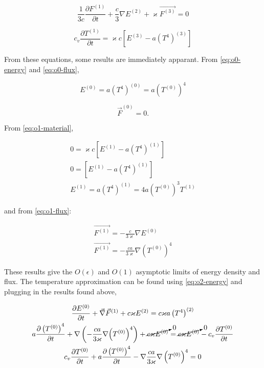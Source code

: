 \documentclass{template}
\begin{document}
\begin{equation}\label{eq:o3-flux}
  \frac{1}{3c}\frac{\partial F^{(1)}}{\partial t} + \frac{c}{3}\nabla E^{(2)} + \varkappa \vec{F^{(3)}} = 0
\end{equation}

\begin{equation}\label{eq:o3-material}
  c_v \frac{\partial T^{(1)}}{\partial t} = \varkappa c \left[ E^{(3)} - a \left( T^4 \right)^{(3)} \right] 
\end{equation}


From these equations, some results are immediately apparant. From \autoref{eq:o0-energy} and \autoref{eq:o0-flux}, 

\begin{equation}
  \boxed{ E^{(0)} = a (T^4)^{(0)} = a\left(T^{(0)} \right)^4}
\end{equation}

\begin{equation}
  \boxed{   \vec{F}^{(0)} = 0.}
\end{equation}


From \autoref{eq:o1-material}, 

\begin{gather}
  0 = \varkappa c \left[ E^{(1)} - a \left( T^4 \right)^{(1)} \right]\\
  0 = \left[ E^{(1)} - a \left( T^4 \right)^{(1)} \right]\\
  \boxed{
    E^{(1)}  =     a \left( T^4 \right)^{(1)}  = 4a \left( T^{(0)} \right)^3 T^{(1)}}
\end{gather}

and from \autoref{eq:o1-flux}:

\begin{gather}
  \vec{F^{(1)}} = -\frac{c}{3 \varkappa} \nabla E^{(0)}\\
  \boxed{\vec{F^{(1)}} = -\frac{c a}{3 \varkappa} \nabla \left(T^{(0)} \right)^4}
\end{gather}

These results give the $O(\epsilon)$ and $O(1)$ asymptotic limits of energy density and flux. The temperature approximation can be found using \autoref{eq:o2-energy} and plugging in the results found above,


\begin{gather}
     \frac{\partial E^{(0)}}{\partial t} + \vec{\nabla}\vec{F}^{(1)} + c\varkappa E^{(2)} = c\varkappa a \left(T^4 \right)^{(2)}\\
  a \frac{\partial \left( T^{(0)} \right)^4}{\partial t} + \nabla \left( -\frac{c a}{3 \varkappa} \nabla {\left(T^{(0)} \right)}^4\right) + \cancelto{0}{ c \varkappa E^{(0)}} = \cancelto{0}{c \varkappa E^{(0)}} - c_v \frac{\partial T^{(0)}}{\partial t}\\
  c_v \frac{\partial T^{(0)}}{\partial t} + a \frac{\partial \left( T^{(0)} \right)^4}{\partial t} - \nabla\frac{ca}{3\varkappa}\nabla\left(T^{(0)} \right)^4 = 0
\end{gather}
\end{document}
